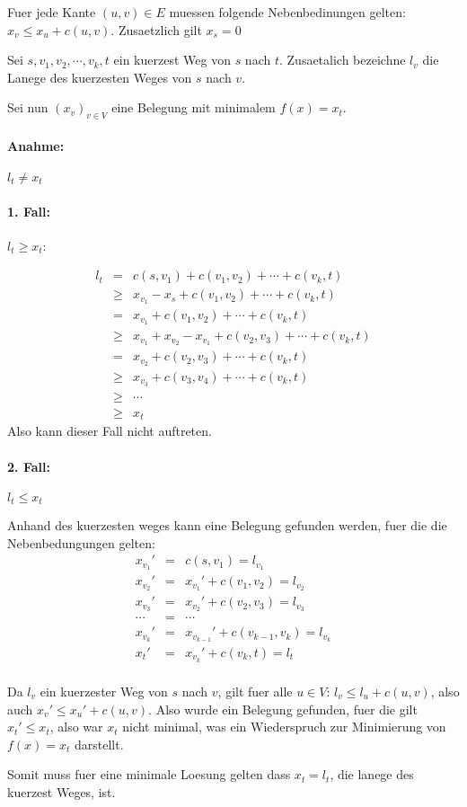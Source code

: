 Fuer jede Kante $(u,v) \in E$ muessen folgende Nebenbedinungen gelten:
$x_v \leq x_u + c(u,v)$. Zusaetzlich gilt $x_s = 0$

Sei $s, v_1, v_2, \cdots, v_k, t$ ein kuerzest Weg von $s$ nach $t$. Zusaetalich bezeichne
$l_v$ die Lanege des kuerzesten Weges von $s$ nach $v$.

Sei nun $(x_v)_{v\in V}$ eine Belegung mit minimalem $f(x) = x_t$.

\paragraph{Anahme:} $l_t \neq x_t$

\paragraph{1. Fall:} $l_t \geq x_t$:

\begin{eqnarray}
    l_t &=&         c(s,v_1) + c(v_1,v_2) + \cdots + c(v_k,t) \\
      &\geq& x_{v_1} - x_s + c(v_1,v_2) + \cdots + c(v_k,t) \\
      &=&    x_{v_1} + c(v_1,v_2) + \cdots + c(v_k,t) \\
      &\geq& x_{v_1} + x_{v_2} - x_{v_1} + c(v_2,v_3) + \cdots + c(v_k,t) \\
      &=&              x_{v_2}           + c(v_2,v_3) + \cdots + c(v_k,t) \\
      &\geq&           x_{v_3}           + c(v_3,v_4) + \cdots + c(v_k,t) \\
      &\geq& \cdots \\
      &\geq& x_t
\end{eqnarray}
Also kann dieser Fall nicht auftreten.

\paragraph{2. Fall:} $l_t \leq x_t$

Anhand des kuerzesten weges kann eine Belegung gefunden werden, fuer die die Nebenbedungungen gelten: 
\begin{eqnarray}
    x_{v_1}' &=& c(s,v_1) = l_{v_1}\\
    x_{v_2}' &=& x_{v_1}' + c(v_1,v_2) = l_{v_2}\\
    x_{v_3}' &=& x_{v_2}' + c(v_2,v_3) = l_{v_3}\\
    \cdots  &=&  \cdots\\
    x_{v_k}' &=& x_{v_{k-1}}' + c(v_{k-1},v_k) = l_{v_k}\\
    x_t' &=&  x_{v_k}' + c(v_{k}, t) = l_t\\
\end{eqnarray}

Da $l_v$ ein kuerzester Weg von $s$ nach $v$, gilt fuer alle $u \in V$: $l_v \leq l_u + c(u,v)$, 
also auch $x_v' \leq x_u' + c(u,v)$. Also wurde ein Belegung gefunden, fuer die gilt
$x_t' \leq x_t$, also war $x_t$ nicht minimal, was ein Wiederspruch zur Minimierung von $f(x) = x_t$ darstellt.

Somit muss fuer eine minimale Loesung gelten dass $x_t = l_t$, die lanege des kuerzest Weges, ist.


